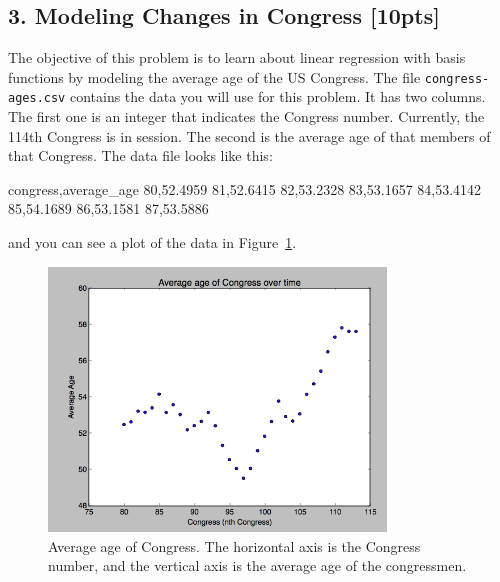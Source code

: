 \documentclass[submit]{harvardml}
\begin{document}
\newpage
\subsection*{3. Modeling Changes in Congress [10pts]}
 The objective of this problem is to learn about linear regression with basis
 functions by modeling the average age of the US Congress. The file
 \verb|congress-ages.csv| contains the data you will use for this problem.  It
 has two columns.  The first one is an integer that indicates the Congress
 number. Currently, the 114th Congress is in session. The second is the average
 age of that members of that Congress.  The data file looks like this:
\begin{csv}
congress,average_age
80,52.4959
81,52.6415
82,53.2328
83,53.1657
84,53.4142
85,54.1689
86,53.1581
87,53.5886
\end{csv}
and you can see a plot of the data in Figure~\ref{fig:congress}.

\begin{figure}[h]
\centering
\includegraphics[width=0.8\textwidth]{congress-ages}
\caption{Average age of Congress.  The horizontal axis is the Congress number, and the vertical axis is the average age of the congressmen.}
\label{fig:congress}
\end{figure}
\end{document}
